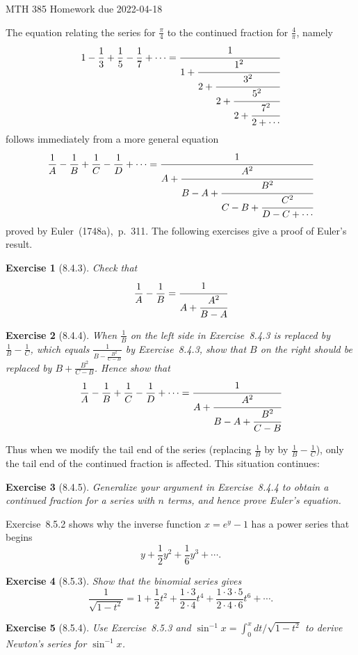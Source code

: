 \documentclass[12pt]{article}
\theoremstyle{plain}
\newtheorem{ex}{Exercise}
\begin{document}
MTH 385 \qquad Homework due 2022-04-18

The equation relating the series for $\frac{\pi}{4}$ to the continued fraction for $\frac{4}{\pi}$, namely
\[
  1-\frac{1}{3}+\frac{1}{5}-\frac{1}{7}+\cdots=\cfrac{1}{1+\cfrac{1^2}{2+\cfrac{3^2}{2+\cfrac{5^2}{2+\cfrac{7^2}{2+\cdots}}}}}
\]
follows immediately from a more general equation
\[
  \frac{1}{A}-\frac{1}{B}+\frac{1}{C}-\frac{1}{D}+\cdots=\cfrac{1}{A+\cfrac{A^2}{B-A+\cfrac{B^2}{C-B+\cfrac{C^2}{D-C+\cdots}}}}
\]
proved by Euler~(1748a),~p.~311. The following exercises give a proof of Euler's result.

\begin{ex} [8.4.3]
  Check that
  \[
    \frac{1}{A}-\frac{1}{B}=\cfrac{1}{A+\cfrac{A^2}{B-A}}
  \]
\end{ex}

\begin{ex} [8.4.4]
  When $\frac{1}{B}$ on the left side in Exercise~8.4.3 is replaced by $\frac{1}{B}-\frac{1}{C}$, which equals $\frac{1}{B-\frac{B^2}{C-B}}$ by Exercise~8.4.3, show that $B$ on the right should be replaced by $B+\frac{B^2}{C-B}$. Hence show that
  \[
    \frac{1}{A}-\frac{1}{B}+\frac{1}{C}-\frac{1}{D}+\cdots=\cfrac{1}{A+\cfrac{A^2}{B-A+\cfrac{B^2}{C-B}}}
  \]
\end{ex}

Thus when we modify the tail end of the series (replacing $\frac{1}{B}$ by by $\frac{1}{B}-\frac{1}{C}$), only the tail end of the continued fraction is affected. This situation continues:

\begin{ex} [8.4.5]
  Generalize your argument in Exercise~8.4.4 to obtain a continued fraction for a series with $n$ terms, and hence prove Euler's equation.
\end{ex}

Exercise~8.5.2 shows why the inverse function $x=e^y-1$ has a power series that begins
\[
  y+\frac{1}{2}y^2+\frac{1}{6}y^3+\cdots.
\]

\begin{ex} [8.5.3]
  Show that the binomial series gives
  \[
    \frac{1}{\sqrt{1-t^2}}=1+\frac{1}{2}t^2+\frac{1\cdot3}{2\cdot4}t^4+\frac{1\cdot3\cdot5}{2\cdot4\cdot6}t^6+\cdots.
  \]
\end{ex}

\begin{ex} [8.5.4]
  Use Exercise~8.5.3 and $\sin^{-1}x=\int_0^xdt/\sqrt{1-t^2}$ to derive Newton's series for $\sin^{-1}x$.
\end{ex}
\end{document}
